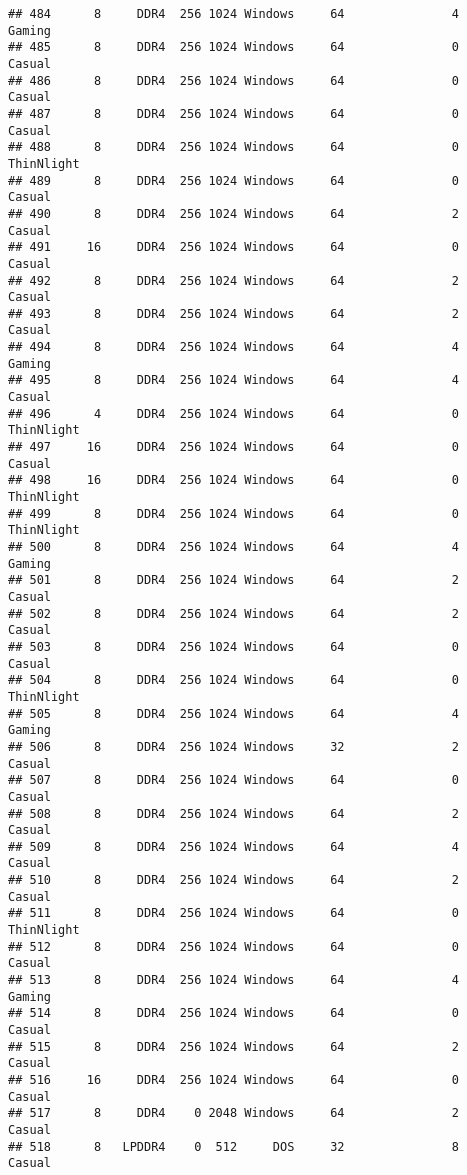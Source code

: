 \documentclass[
]{article}
\begin{document}
\begin{verbatim}
## 484      8     DDR4  256 1024 Windows     64               4     Gaming
## 485      8     DDR4  256 1024 Windows     64               0     Casual
## 486      8     DDR4  256 1024 Windows     64               0     Casual
## 487      8     DDR4  256 1024 Windows     64               0     Casual
## 488      8     DDR4  256 1024 Windows     64               0 ThinNlight
## 489      8     DDR4  256 1024 Windows     64               0     Casual
## 490      8     DDR4  256 1024 Windows     64               2     Casual
## 491     16     DDR4  256 1024 Windows     64               0     Casual
## 492      8     DDR4  256 1024 Windows     64               2     Casual
## 493      8     DDR4  256 1024 Windows     64               2     Casual
## 494      8     DDR4  256 1024 Windows     64               4     Gaming
## 495      8     DDR4  256 1024 Windows     64               4     Casual
## 496      4     DDR4  256 1024 Windows     64               0 ThinNlight
## 497     16     DDR4  256 1024 Windows     64               0     Casual
## 498     16     DDR4  256 1024 Windows     64               0 ThinNlight
## 499      8     DDR4  256 1024 Windows     64               0 ThinNlight
## 500      8     DDR4  256 1024 Windows     64               4     Gaming
## 501      8     DDR4  256 1024 Windows     64               2     Casual
## 502      8     DDR4  256 1024 Windows     64               2     Casual
## 503      8     DDR4  256 1024 Windows     64               0     Casual
## 504      8     DDR4  256 1024 Windows     64               0 ThinNlight
## 505      8     DDR4  256 1024 Windows     64               4     Gaming
## 506      8     DDR4  256 1024 Windows     32               2     Casual
## 507      8     DDR4  256 1024 Windows     64               0     Casual
## 508      8     DDR4  256 1024 Windows     64               2     Casual
## 509      8     DDR4  256 1024 Windows     64               4     Casual
## 510      8     DDR4  256 1024 Windows     64               2     Casual
## 511      8     DDR4  256 1024 Windows     64               0 ThinNlight
## 512      8     DDR4  256 1024 Windows     64               0     Casual
## 513      8     DDR4  256 1024 Windows     64               4     Gaming
## 514      8     DDR4  256 1024 Windows     64               0     Casual
## 515      8     DDR4  256 1024 Windows     64               2     Casual
## 516     16     DDR4  256 1024 Windows     64               0     Casual
## 517      8     DDR4    0 2048 Windows     64               2     Casual
## 518      8   LPDDR4    0  512     DOS     32               8     Casual

\end{verbatim}
\end{document}
